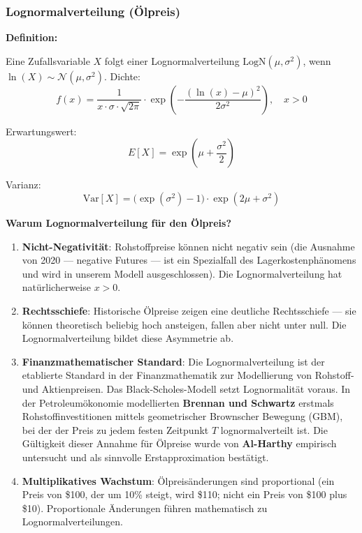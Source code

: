 \documentclass[11pt,a4paper]{article}
\begin{document}
\subsubsection{Lognormalverteilung (Ölpreis)}

\textbf{Definition:}

Eine Zufallsvariable $X$ folgt einer Lognormalverteilung $\text{LogN}(\mu, \sigma^2)$, wenn $\ln(X) \sim \mathcal{N}(\mu, \sigma^2)$. Dichte:
\begin{equation}
f(x) = \frac{1}{x \cdot \sigma \cdot \sqrt{2\pi}} \cdot \exp\!\left(-\frac{(\ln(x) - \mu)^2}{2\sigma^2}\right), \quad x > 0
\end{equation}

Erwartungswert:
\begin{equation}
E[X] = \exp\!\left(\mu + \frac{\sigma^2}{2}\right)
\end{equation}

Varianz:
\begin{equation}
\text{Var}[X] = \bigl(\exp(\sigma^2) - 1\bigr) \cdot \exp(2\mu + \sigma^2)
\end{equation}

\textbf{Warum Lognormalverteilung für den Ölpreis?}

\begin{enumerate}[label=\arabic*., itemsep=4pt]
  \item \textbf{Nicht-Negativität}: Rohstoffpreise können nicht negativ sein (die Ausnahme von 2020 — negative Futures — ist ein Spezialfall des Lagerkostenphänomens und wird in unserem Modell ausgeschlossen). Die Lognormalverteilung hat natürlicherweise $x > 0$.
  \item \textbf{Rechtsschiefe}: Historische Ölpreise zeigen eine deutliche Rechtsschiefe — sie können theoretisch beliebig hoch ansteigen, fallen aber nicht unter null. Die Lognormalverteilung bildet diese Asymmetrie ab.
  \item \textbf{Finanzmathematischer Standard}: Die Lognormalverteilung ist der etablierte Standard in der Finanzmathematik zur Modellierung von Rohstoff- und Aktienpreisen. Das Black-Scholes-Modell setzt Lognormalität voraus. In der Petroleumökonomie modellierten \textbf{Brennan und Schwartz} \cite{brennan1985} erstmals Rohstoffinvestitionen mittels geometrischer Brownscher Bewegung (GBM), bei der der Preis zu jedem festen Zeitpunkt $T$ lognormalverteilt ist. Die Gültigkeit dieser Annahme für Ölpreise wurde von \textbf{Al-Harthy} \cite{alharthy2005} empirisch untersucht und als sinnvolle Erstapproximation bestätigt.
  \item \textbf{Multiplikatives Wachstum}: Ölpreisänderungen sind proportional (ein Preis von \$100, der um 10\% steigt, wird \$110; nicht ein Preis von \$100 plus \$10). Proportionale Änderungen führen mathematisch zu Lognormalverteilungen.
\end{enumerate}
\end{document}
